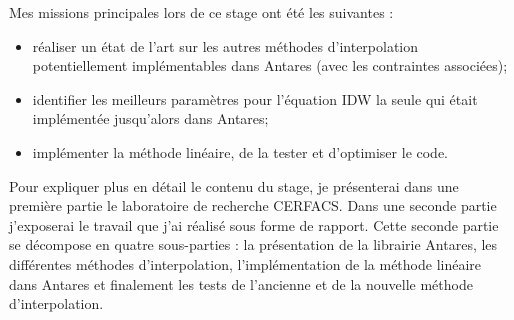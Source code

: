 Mes missions principales lors de ce stage ont été les suivantes :

\begin{itemize}
    \item réaliser un état de l'art sur les autres méthodes d'interpolation potentiellement implémentables dans Antares (avec les contraintes associées);
    \item identifier les meilleurs paramètres pour l'équation \ac{IDW} la seule qui était implémentée jusqu'alors dans Antares;
    \item implémenter la méthode linéaire, de la tester et d'optimiser le code.  %
\end{itemize}


Pour expliquer plus en détail le contenu du stage, je présenterai dans une première partie le laboratoire de recherche CERFACS. Dans une seconde partie j’exposerai le travail que j’ai réalisé sous forme de rapport. Cette seconde partie se décompose en quatre sous-parties : la présentation de la librairie Antares, les différentes méthodes d'interpolation, l'implémentation de la méthode linéaire dans Antares et finalement les tests de l'ancienne et de la nouvelle méthode d'interpolation.